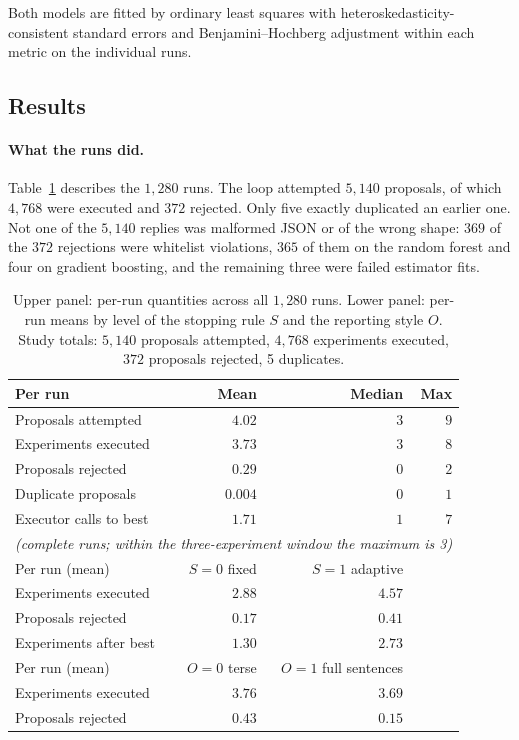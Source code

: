 \documentclass[11pt]{article}
\begin{document}
Both models are fitted by ordinary least squares with heteroskedasticity-consistent standard errors and Benjamini--Hochberg adjustment within each metric on the individual runs.

\subsection{Results}
\label{sec:results}

\paragraph{What the runs did.} Table~\ref{tab:descriptives} describes the $1{,}280$ runs. The loop attempted $5{,}140$ proposals, of which $4{,}768$ were executed and $372$ rejected. Only five exactly duplicated an earlier one. Not one of the $5{,}140$ replies was malformed JSON or of the wrong shape: $369$ of the $372$ rejections were whitelist violations, $365$ of them on the random forest and four on gradient boosting, and the remaining three were failed estimator fits. 
\begin{table}[t]
\centering
\small
\caption{Upper panel: per-run quantities across all $1{,}280$ runs. Lower panel: per-run means by level of the stopping rule $S$ and the reporting style $O$. Study totals: $5{,}140$ proposals attempted, $4{,}768$ experiments executed, $372$ proposals rejected, 5 duplicates.}
\label{tab:descriptives}
\begin{tabular}{lrrr}
\toprule
Per run & Mean & Median & Max \\
\midrule
Proposals attempted    & $4.02$  & $3$ & $9$ \\
Experiments executed   & $3.73$  & $3$ & $8$ \\
Proposals rejected     & $0.29$  & $0$ & $2$ \\
Duplicate proposals    & $0.004$ & $0$ & $1$ \\
Executor calls to best & $1.71$  & $1$ & $7$ \\
\multicolumn{4}{l}{\footnotesize\itshape (complete runs; within the three-experiment window the maximum is 3)} \\
\midrule
Per run (mean) & $S=0$ fixed & $S=1$ adaptive & \\
\midrule
Experiments executed   & $2.88$ & $4.57$ & \\
Proposals rejected     & $0.17$ & $0.41$ & \\
Experiments after best & $1.30$ & $2.73$ & \\
\midrule
Per run (mean) & $O=0$ terse & $O=1$ full sentences & \\
\midrule
Experiments executed   & $3.76$ & $3.69$ & \\
Proposals rejected     & $0.43$ & $0.15$ & \\
\bottomrule
\end{tabular}
\end{table}
\end{document}
